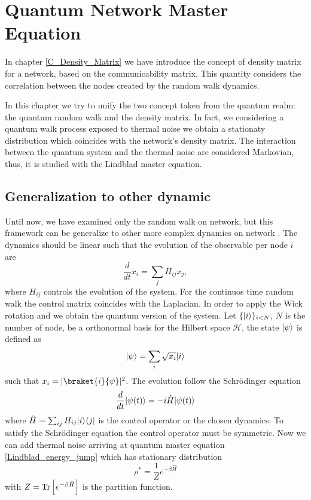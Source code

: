 \chapter{Quantum Network Master Equation}

In chapter \ref{C_Density_Matrix} we have introduce the concept of density matrix for a network, based on the communicability matrix. This quantity considers the correlation between the nodes created by the random walk dynamics. 

In this chapter we try to unify the two concept taken from the quantum realm: the quantum random walk and the density matrix.
In fact, we considering a quantum walk process exposed to thermal noise we obtain a stationaty distribution which coincides with the network's density matrix. 
The interaction between the quantum system and the thermal noise are considered Markovian, thus, it is studied with the Lindblad master equation.






\section{Generalization to other dynamic}

Until now, we have examined only the random walk on network, but this framework can be generalize to other more complex dynamics on network \cite{De_Domenico_2023}.
The dynamics should be linear such that the evolution of the observable per node $i$ are 
\begin{equation}\label{general_dynamics}
    \frac{d}{dt} x_i = \sum_j H_{ij} x_j,
\end{equation}
where $H_{ij}$ controls the evolution of the system.
For the continuos time random walk the control matrix coincides with the Laplacian.
In order to apply the Wick rotation and we obtain the quantum version of the system.
Let $\{\lvert i\rangle\}_{i<N}$, $N$ is the number of node, be a orthonormal basis for the Hilbert space $\mathcal{H}$, the state $\lvert\psi\rangle$ is defined as
\begin{equation}
    \lvert\psi\rangle= \sum_i\sqrt{x_i}\lvert i\rangle
\end{equation}
such that $x_i = |\braket{i}{\psi}|^2$.
The evolution follow the Schrödinger equation
\begin{equation}
    \frac{d}{dt}\lvert\psi(t)\rangle = -i\hat H\lvert\psi(t)\rangle
\end{equation}
where 
$\hat H = \sum_{ij} H_{ij} \lvert i\rangle\langle j\rvert$ is the control operator or the chosen dynamics. To satisfy the Schrödinger equation the control operator must be symmetric.
Now we can add thermal noise arriving at quantum master equation \eqref{Lindblad_energy_jump} which has stationary distribution 
\begin{equation}
    \rho^*= \frac{1}{Z}e^{-\beta\hat H}
\end{equation}
with $Z= \operatorname{Tr}\left[e^{-\beta\hat H}\right]$ is the partition function.

